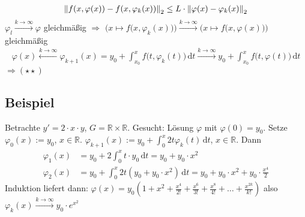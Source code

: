 \begin{description}
	\begin{align*}
		\norm[2]{f(x, \varphi(x)) - f(x, \varphi_k(x))} \le L \cdot \norm[2]{\varphi (x) - \varphi_k(x)} 
	\end{align*}
	$\varphi_l \xrightarrow{k \to \infty} \varphi$ gleichmäßig
	$\Rightarrow $ $\Big(x \mapsto f\big(x, \varphi_k(x)\big)\Big) \xrightarrow{k \to \infty} \Big(x \mapsto f\big(x, \varphi(x)\big)\Big)$ 
	gleichmäßig 
	\begin{align*}
		\varphi(x) \stackrel{k \to \infty}{\longleftarrow} \varphi_{k+1}(x) = y_0 + \int_{x_0} ^{x} \! f\big( t, \varphi_k(t)\big)  \, \mathrm{d}t 
		\xrightarrow{k \to \infty} y_0 + \int_{x_0} ^{x} \! f\big(t, \varphi(t)\big)  \, \mathrm{d}t
	\end{align*}
	$\Rightarrow (\star\star)$ \bewende
\end{description}

\subsection[Beispiel: Anwendung von Picard-Lindelöf]{Beispiel} %
\label{sub:18}
Betrachte $y' = 2 \cdot x \cdot  y$, $G = \mathds{R}\times \mathds{R}$. Gesucht: Lösung $\varphi$ mit $\varphi(0)=y_0$. Setze $\varphi_0(x) := y_0$, $x \in \mathds{R}$.
$\varphi_{k+1}(x) := y_0 + \int_{0} ^{x} \! 2 t \varphi_k(t)  \, \mathrm{d}t$, $x \in \mathds{R}$. Dann
\begin{align*}
	\varphi_1(x) &= y_0 + 2 \int_{0} ^{x} \! t \cdot  y_0  \, \mathrm{d}t = y_0 + y_0 \cdot x^2 \\
	\varphi_2(x) &= y_0 + \int_{0} ^{x} \! 2 t (y_0 + y_0 \cdot x^2)  \, \mathrm{d}t = y_0 + y_0 \cdot x^2 + y_0 \cdot \frac{x^4}{2} 
\end{align*}
Induktion liefert dann: $\varphi(x) = y_0(1+ x^2 + \frac{x^4}{2!} + \frac{x^6}{3!} + \frac{x^8}{4!} + \ldots + \frac{x^{2k}}{k!}    )$ also 
$\varphi_k (x) \xrightarrow{k \to \infty} y_0 \cdot e^{x^2}$


